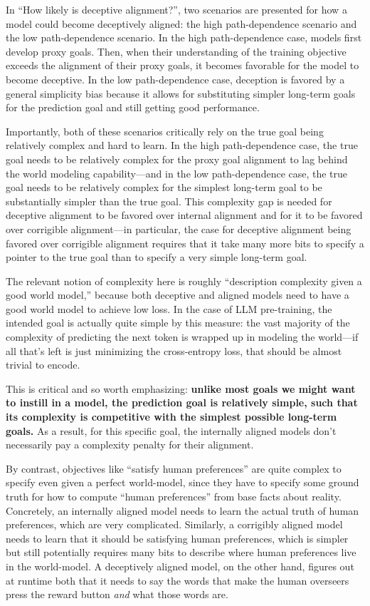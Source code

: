 \documentclass[
  onecolumn,
  natbib,
]{miri-tech-article}
\begin{document}
In ``How likely is deceptive alignment?\cite{how_likely_deception}'', two scenarios are presented for how a model could become deceptively aligned: the high path-dependence scenario and the low path-dependence scenario. In the high path-dependence case, models first develop proxy goals. Then, when their understanding of the training objective exceeds the alignment of their proxy goals, it becomes favorable for the model to become deceptive. In the low path-dependence case, deception is favored by a general simplicity bias because it allows for substituting simpler long-term goals for the prediction goal and still getting good performance.

Importantly, both of these scenarios critically rely on the true goal being relatively complex and hard to learn. In the high path-dependence case, the true goal needs to be relatively complex for the proxy goal alignment to lag behind the world modeling capability---and in the low path-dependence case, the true goal needs to be relatively complex for the simplest long-term goal to be substantially simpler than the true goal. This complexity gap is needed for deceptive alignment to be favored over internal alignment and for it to be favored over corrigible alignment---in particular, the case for deceptive alignment being favored over corrigible alignment requires that it take many more bits to specify a pointer to the true goal than to specify a very simple long-term goal.

The relevant notion of complexity here is roughly ``description complexity given a good world model,'' because both deceptive and aligned models need to have a good world model to achieve low loss. In the case of LLM pre-training, the intended goal is actually quite simple by this measure: the vast majority of the complexity of predicting the next token is wrapped up in modeling the world---if all that's left is just minimizing the cross-entropy loss, that should be almost trivial to encode.

This is critical and so worth emphasizing: \textbf{unlike most goals we might want to instill in a model, the prediction goal is relatively simple, such that its complexity is competitive with the simplest possible long-term goals.} As a result, for this specific goal, the internally aligned models don't necessarily pay a complexity penalty for their alignment.

By contrast, objectives like ``satisfy human preferences'' are quite complex to specify even given a perfect world-model, since they have to specify some ground truth for how to compute ``human preferences'' from base facts about reality. Concretely, an internally aligned model needs to learn the actual truth of human preferences, which are very complicated. Similarly, a corrigibly aligned model needs to learn that it should be satisfying human preferences, which is simpler but still potentially requires many bits to describe where human preferences live in the world-model. A deceptively aligned model, on the other hand, figures out at runtime both that it needs to say the words that make the human overseers press the reward button \textit{and} what those words are.
\end{document}
